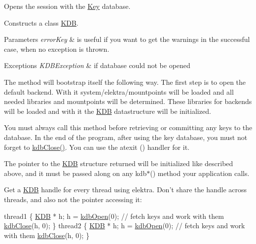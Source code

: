 Opens the session with the \hyperlink{classkdb_1_1Key}{Key} database.  

Constructs a class \hyperlink{classkdb_1_1KDB}{K\-D\-B}.


\begin{DoxyParams}{Parameters}
{\em error\-Key} & is useful if you want to get the warnings in the successful case, when no exception is thrown.\\
\hline
\end{DoxyParams}

\begin{DoxyExceptions}{Exceptions}
{\em K\-D\-B\-Exception} & if database could not be opened\\
\hline
\end{DoxyExceptions}
The method will bootstrap itself the following way. The first step is to open the default backend. With it system/elektra/mountpoints will be loaded and all needed libraries and mountpoints will be determined. These libraries for backends will be loaded and with it the {\ttfamily \hyperlink{classkdb_1_1KDB}{K\-D\-B}} datastructure will be initialized.

You must always call this method before retrieving or committing any keys to the database. In the end of the program, after using the key database, you must not forget to \hyperlink{group__kdb_gadb54dc9fda17ee07deb9444df745c96f}{kdb\-Close()}. You can use the atexit () handler for it.

The pointer to the {\ttfamily \hyperlink{classkdb_1_1KDB}{K\-D\-B}} structure returned will be initialized like described above, and it must be passed along on any kdb$\ast$() method your application calls.

Get a {\ttfamily \hyperlink{classkdb_1_1KDB}{K\-D\-B}} handle for every thread using elektra. Don't share the handle across threads, and also not the pointer accessing it\-: 
\begin{DoxyCode}
thread1
\{
        \hyperlink{classkdb_1_1KDB_a7e0637995ce9f294cdbc6f167df6db40}{KDB} * h;
        h = \hyperlink{group__kdb_ga6808defe5870f328dd17910aacbdc6ca}{kdbOpen}(0);
        \textcolor{comment}{// fetch keys and work with them}
        \hyperlink{group__kdb_gadb54dc9fda17ee07deb9444df745c96f}{kdbClose}(h, 0);
\}
thread2
\{
        \hyperlink{classkdb_1_1KDB_a7e0637995ce9f294cdbc6f167df6db40}{KDB} * h;
        h = \hyperlink{group__kdb_ga6808defe5870f328dd17910aacbdc6ca}{kdbOpen}(0);
        \textcolor{comment}{// fetch keys and work with them}
        \hyperlink{group__kdb_gadb54dc9fda17ee07deb9444df745c96f}{kdbClose}(h, 0);
\}
\end{DoxyCode}


